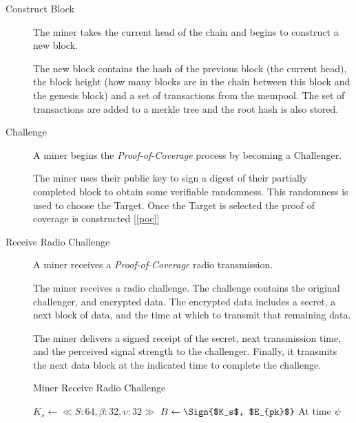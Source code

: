 \documentclass[letterpaper,11pt]{article}
\begin{document}
\begin{description}
  \item [Construct Block] The miner takes the current head of the chain and begins to construct a new block.

    The new block contains the hash of the previous block (the current head), the block height (how many blocks are in the chain between this block and the genesis block) and a set of transactions from the mempool. The set of transactions are added to a merkle tree and the root hash is also stored.

  \item [Challenge] A miner begins the \emph{Proof-of-Coverage} process by becoming a Challenger.

    The miner uses their public key to sign a digest of their partially completed block to obtain some verifiable randomness. This randomness is used to choose the Target. Once the Target is selected the proof of coverage is constructed [\ref{poc}]

  \item [Receive Radio Challenge] A miner receives a \emph{Proof-of-Coverage} radio transmission.

    The miner receives a radio challenge. The challenge contains the original challenger, and encrypted data. The encrypted data includes a secret, a next block of data, and the time at which to transmit that remaining data.

    The miner delivers a signed receipt of the secret, next transmission time, and the perceived signal strength to the challenger. Finally, it transmits the next data block at the indicated time to complete the challenge.

    \begin{algorithm}[!htb]
      \DontPrintSemicolon
      \caption{Miner Receive Radio Challenge}\label{proto:miner.recv.challenge.radio}

       {
         {
           {
            $K_s \leftarrow \ll S:64, \beta:32, \upsilon:32 \gg $\;
            $B \leftarrow \Sign{$K_s$, $E_{pk}$} $\;
            \;
            At time $\psi$ \;
          }
        }
      }
    \end{algorithm}
    \FloatBarrier


\end{description}
\end{document}
